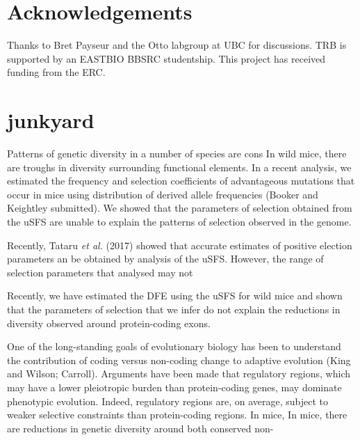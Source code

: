 \documentclass[11pt]{article}
\newcommand{\beginsupplement}{%
        \setcounter{table}{0}
        \renewcommand{\thetable}{S\arabic{table}}%
        \setcounter{figure}{0}
        \renewcommand{\thefigure}{S\arabic{figure}}%
     }
\begin{document}
\section*{Acknowledgements}

Thanks to Bret Payseur and the Otto labgroup at UBC for discussions. TRB is supported by an EASTBIO BBSRC studentship. This project has received funding from the ERC.

 
%

\beginsupplement

\newpage





\section*{junkyard}

Patterns of genetic diversity in a number of species are cons
In wild mice, there are troughs in diversity surrounding functional elements. In a recent analysis, we estimated the frequency and selection coefficients of advantageous mutations that occur in mice using distribution of derived allele frequencies (Booker and Keightley submitted). We showed that the parameters of selection obtained from the uSFS are unable to explain the patterns of selection observed in the genome.

Recently, Tataru \textit{et al.} (2017) showed that accurate estimates of positive election parameters an be obtained by analysis of the uSFS. However, the range of selection parameters that analysed may not

Recently, we have estimated the DFE using the uSFS for wild mice and shown that the parameters of selection that we infer do not explain the reductions in diversity observed around protein-coding exons. 


One of the long-standing goals of evolutionary biology has been to understand the contribution of coding versus non-coding change to adaptive evolution (King and Wilson; Carroll). Arguments have been made that regulatory regions, which may have a lower pleiotropic burden than protein-coding genes, may dominate phenotypic evolution. Indeed, regulatory regions are, on average,  subject to weaker selective constraints than protein-coding regions. In mice, 
In mice, there are reductions in genetic diversity around both conserved non-
\end{document}
